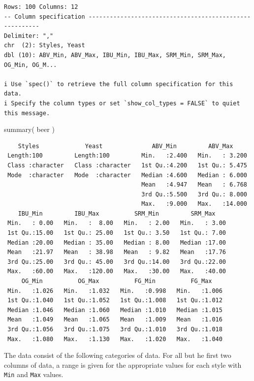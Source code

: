 \documentclass[
  letterpaper,
]{book}
\newenvironment{Shaded}{\begin{snugshade}}{\end{snugshade}}
\newcommand{\FunctionTok}[1]{\textcolor[rgb]{0.28,0.35,0.67}{#1}}
\newcommand{\NormalTok}[1]{\textcolor[rgb]{0.00,0.23,0.31}{#1}}
\begin{document}
\begin{verbatim}
Rows: 100 Columns: 12
-- Column specification --------------------------------------------------------
Delimiter: ","
chr  (2): Styles, Yeast
dbl (10): ABV_Min, ABV_Max, IBU_Min, IBU_Max, SRM_Min, SRM_Max, OG_Min, OG_M...

i Use `spec()` to retrieve the full column specification for this data.
i Specify the column types or set `show_col_types = FALSE` to quiet this message.
\end{verbatim}

\begin{Shaded}
\begin{Highlighting}[]
\FunctionTok{summary}\NormalTok{( beer )}
\end{Highlighting}
\end{Shaded}

\begin{verbatim}
    Styles             Yeast              ABV_Min         ABV_Max      
 Length:100         Length:100         Min.   :2.400   Min.   : 3.200  
 Class :character   Class :character   1st Qu.:4.200   1st Qu.: 5.475  
 Mode  :character   Mode  :character   Median :4.600   Median : 6.000  
                                       Mean   :4.947   Mean   : 6.768  
                                       3rd Qu.:5.500   3rd Qu.: 8.000  
                                       Max.   :9.000   Max.   :14.000  
    IBU_Min         IBU_Max          SRM_Min         SRM_Max     
 Min.   : 0.00   Min.   :  8.00   Min.   : 2.00   Min.   : 3.00  
 1st Qu.:15.00   1st Qu.: 25.00   1st Qu.: 3.50   1st Qu.: 7.00  
 Median :20.00   Median : 35.00   Median : 8.00   Median :17.00  
 Mean   :21.97   Mean   : 38.98   Mean   : 9.82   Mean   :17.76  
 3rd Qu.:25.00   3rd Qu.: 45.00   3rd Qu.:14.00   3rd Qu.:22.00  
 Max.   :60.00   Max.   :120.00   Max.   :30.00   Max.   :40.00  
     OG_Min          OG_Max          FG_Min          FG_Max     
 Min.   :1.026   Min.   :1.032   Min.   :0.998   Min.   :1.006  
 1st Qu.:1.040   1st Qu.:1.052   1st Qu.:1.008   1st Qu.:1.012  
 Median :1.046   Median :1.060   Median :1.010   Median :1.015  
 Mean   :1.049   Mean   :1.065   Mean   :1.009   Mean   :1.016  
 3rd Qu.:1.056   3rd Qu.:1.075   3rd Qu.:1.010   3rd Qu.:1.018  
 Max.   :1.080   Max.   :1.130   Max.   :1.020   Max.   :1.040  
\end{verbatim}

The data consist of the following categories of data. For all but he
first two columns of data, a range is given for the appropriate values
for each style with \texttt{Min} and \texttt{Max} values.
\end{document}
